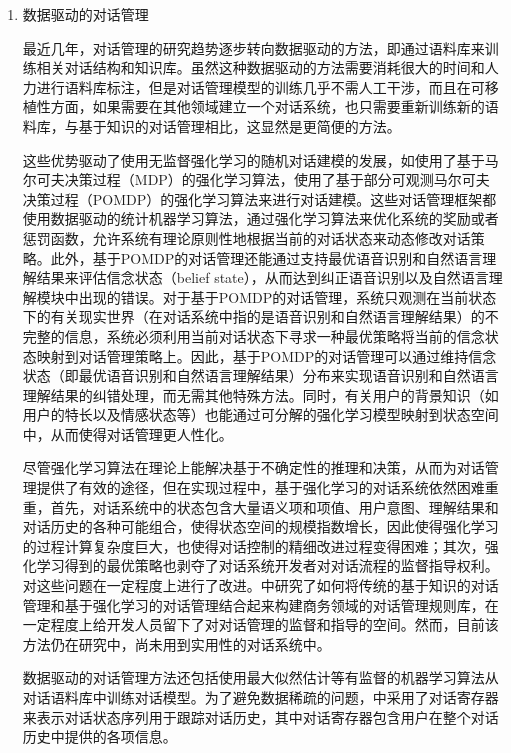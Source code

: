\begin{enumerate}
\item 数据驱动的对话管理

最近几年，对话管理的研究趋势逐步转向数据驱动的方法，即通过语料库来训练相关对话结构和知识库。虽然这种数据驱动的方法需要消耗很大的时间和人力进行语料库标注，但是对话管理模型的训练几乎不需人工干涉，而且在可移植性方面，如果需要在其他领域建立一个对话系统，也只需要重新训练新的语料库，与基于知识的对话管理相比，这显然是更简便的方法。

这些优势驱动了使用无监督强化学习的随机对话建模的发展，如\cite{Levin2000}使用了基于马尔可夫决策过程（MDP）的强化学习算法，\cite{WilliamsYoung2007, Young2013, Williams2013, Kim2015, Henderson2013}使用了基于部分可观测马尔可夫决策过程（POMDP）的强化学习算法来进行对话建模。这些对话管理框架都使用数据驱动的统计机器学习算法，通过强化学习算法来优化系统的奖励或者惩罚函数，允许系统有理论原则性地根据当前的对话状态来动态修改对话策略。此外，基于POMDP的对话管理还能通过支持最优语音识别和自然语言理解结果来评估信念状态（belief state），从而达到纠正语音识别以及自然语言理解模块中出现的错误。对于基于POMDP的对话管理，系统只观测在当前状态下的有关现实世界（在对话系统中指的是语音识别和自然语言理解结果）的不完整的信息，系统必须利用当前对话状态下寻求一种最优策略将当前的信念状态映射到对话管理策略上。因此，基于POMDP的对话管理可以通过维持信念状态（即最优语音识别和自然语言理解结果）分布来实现语音识别和自然语言理解结果的纠错处理，而无需其他特殊方法。同时，有关用户的背景知识（如用户的特长以及情感状态等）也能通过可分解的强化学习模型映射到状态空间中，从而使得对话管理更人性化。

尽管强化学习算法在理论上能解决基于不确定性的推理和决策，从而为对话管理提供了有效的途径，但在实现过程中，基于强化学习的对话系统依然困难重重\cite{Paek2006}，首先，对话系统中的状态包含大量语义项和项值、用户意图、理解结果和对话历史的各种可能组合，使得状态空间的规模指数增长\cite{yukai2014}，因此使得强化学习的过程计算复杂度巨大，也使得对话控制的精细改进过程变得困难；其次，强化学习得到的最优策略也剥夺了对话系统开发者对对话流程的监督指导权利。\cite{WilliamsYoung2005, Lemon2006, Young2007, Thomson2008, Williams2008b}对这些问题在一定程度上进行了改进。\cite{Lemon2006, Williams2008b}中研究了如何将传统的基于知识的对话管理和基于强化学习的对话管理结合起来构建商务领域的对话管理规则库，在一定程度上给开发人员留下了对对话管理的监督和指导的空间。然而，目前该方法仍在研究中，尚未用到实用性的对话系统中。

数据驱动的对话管理方法还包括使用最大似然估计等有监督的机器学习算法从对话语料库中训练对话模型\cite{Hurtado2005}。为了避免数据稀疏的问题，\cite{Hurtado2005}中采用了对话寄存器来表示对话状态序列用于跟踪对话历史，其中对话寄存器包含用户在整个对话历史中提供的各项信息。


\end{enumerate}
